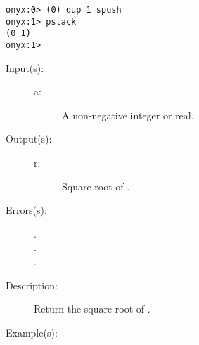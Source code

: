 \begin{description}
\begin{description}
\begin{verbatim}
onyx:0> (0) dup 1 spush
onyx:1> pstack
(0 1)
onyx:1>
		\end{verbatim}
	\end{description}
\label{systemdict:sqrt}
\item[{\onyxop{a}{sqrt}{r}}: ]
	\begin{description}\item[]
	\item[Input(s): ]
		\begin{description}\item[]
		\item[a: ]
			A non-negative integer or real.
		\end{description}
	\item[Output(s): ]
		\begin{description}\item[]
		\item[r: ]
			Square root of .
		\end{description}
	\item[Errors(s): ]
		\begin{description}\item[]
		\item[.]
		\item[.]
		\item[.]
		\end{description}
	\item[Description: ]
		Return the square root of .
	\item[Example(s): ]\begin{verbatim}


\end{verbatim}
\end{description}
\end{description}
